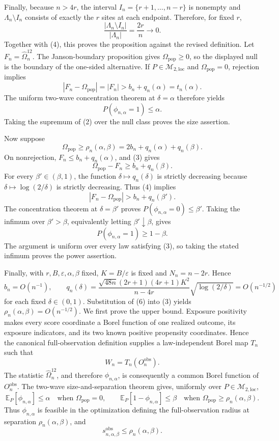 Finally, because \(n>4r\), the interval \(I_n=\{r+1,\ldots,n-r\}\) is nonempty and \(\Lambda_n\setminus I_n\) consists of exactly the \(r\) sites at each endpoint.  Therefore, for fixed \(r\),
\[
 \frac{|\Lambda_n\setminus I_n|}{|\Lambda_n|}
 =\frac{2r}{n}\longrightarrow0.
\]
Together with (4), this proves the proposition against the revised definition.
Let \(F_n=\widehat\Omega_n^{12}\).  The Janson-boundary proposition gives \(\Omega_{\mathrm{pop}}\ge0\), so the displayed null is the boundary of the one-sided alternative.  If \(P\in\mathcal M_{2,\mathrm{loc}}\) and \(\Omega_{\mathrm{pop}}=0\), rejection implies
\[
 |F_n-\Omega_{\mathrm{pop}}|=|F_n|
 >b_n+q_n(\alpha)=t_n(\alpha). \tag{1}
\]
The uniform two-wave concentration theorem at \(\delta=\alpha\) therefore yields
\[
 P(\phi_{n,\alpha}=1)\le\alpha. \tag{2}
\]
Taking the supremum of (2) over the null class proves the size assertion.

Now suppose
\[
 \Omega_{\mathrm{pop}}\ge\rho_n(\alpha,\beta)
 =2b_n+q_n(\alpha)+q_n(\beta). \tag{3}
\]
On nonrejection, \(F_n\le b_n+q_n(\alpha)\), and (3) gives
\[
 \Omega_{\mathrm{pop}}-F_n
 \ge b_n+q_n(\beta). \tag{4}
\]
For every \(\beta'\in(\beta,1)\), the function \(\delta\mapsto q_n(\delta)\) is strictly decreasing because \(\delta\mapsto\log(2/\delta)\) is strictly decreasing.  Thus (4) implies
\[
 |F_n-\Omega_{\mathrm{pop}}|>b_n+q_n(\beta').
\]
The concentration theorem at \(\delta=\beta'\) proves \(P(\phi_{n,\alpha}=0)\le\beta'\).  Taking the infimum over \(\beta'>\beta\), equivalently letting \(\beta'\downarrow\beta\), gives
\[
 P(\phi_{n,\alpha}=1)\ge1-\beta. \tag{5}
\]
The argument is uniform over every law satisfying (3), so taking the stated infimum proves the power assertion.

Finally, with \(r,B,\varepsilon,\alpha,\beta\) fixed, \(K=B/\varepsilon\) is fixed and \(N_n=n-2r\).  Hence
\[
 b_n=O(n^{-1}),
 \qquad
 q_n(\delta)
 =\frac{\sqrt{48n}(2r+1)(4r+1)K^2}{n-4r}
  \sqrt{\log(2/\delta)}
 =O(n^{-1/2}) \tag{6}
\]
for each fixed \(\delta\in(0,1)\).  Substitution of (6) into (3) yields \(\rho_n(\alpha,\beta)=O(n^{-1/2})\).
We first prove the upper bound.  Exposure positivity makes every score coordinate a Borel function of one realized outcome, its exposure indicators, and its two known positive propensity coordinates.  Hence the canonical full-observation definition supplies a law-independent Borel map \(T_n\) such that
\[
 W_n=T_n(O_n^{\mathrm{obs}}). \tag{1}
\]
The statistic \(\widehat\Omega_n^{12}\), and therefore \(\phi_{n,\alpha}\), is consequently a common Borel function of \(O_n^{\mathrm{obs}}\).  The two-wave size-and-separation theorem gives, uniformly over \(P\in\mathcal M_{2,\mathrm{loc}}\),
\[
 \mathbb E_P[\phi_{n,\alpha}]\le\alpha
 \quad\text{when }\Omega_{\mathrm{pop}}=0,
 \qquad
 \mathbb E_P[1-\phi_{n,\alpha}]\le\beta
 \quad\text{when }\Omega_{\mathrm{pop}}\ge\rho_n(\alpha,\beta). \tag{2}
\]
Thus \(\phi_{n,\alpha}\) is feasible in the optimization defining the full-observation radius at separation \(\rho_n(\alpha,\beta)\), and
\[
 s_{n,\alpha,\beta}^{\mathrm{obs}}
 \le\rho_n(\alpha,\beta). \tag{3}
\]

